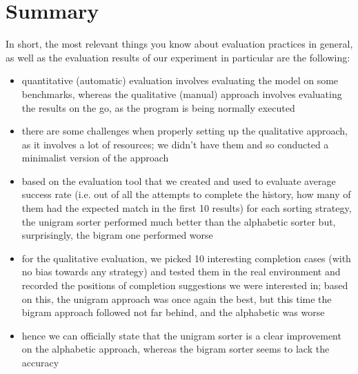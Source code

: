 \section{Summary}
\label{sec:Evaluation-Summary}
In short, the most relevant things you know about evaluation practices in general, as well as the evaluation results of our experiment in particular are the following:
\begin{itemize}
    \item quantitative (automatic) evaluation involves evaluating the model on some benchmarks, whereas the qualitative (manual) approach involves evaluating the results on the go, as the program is being normally executed
    \item there are some challenges when properly setting up the qualitative approach, as it involves a lot of resources; we didn't have them and so conducted a minimalist version of the approach
    \item based on the evaluation tool that we created and used to evaluate average success rate (i.e. out of all the attempts to complete the history, how many of them had the expected match in the first 10 results) for each sorting strategy, the unigram sorter performed much better than the alphabetic sorter but, surprisingly, the bigram one performed worse
    \item for the qualitative evaluation, we picked 10 interesting completion cases (with no bias towards any strategy) and tested them in the real environment and recorded the positions of completion suggestions we were interested in; based on this, the unigram approach was once again the best, but this time the bigram approach followed not far behind, and the alphabetic was worse
    \item hence we can officially state that the unigram sorter is a clear improvement on the alphabetic approach, whereas the bigram sorter seems to lack the accuracy
\end{itemize}